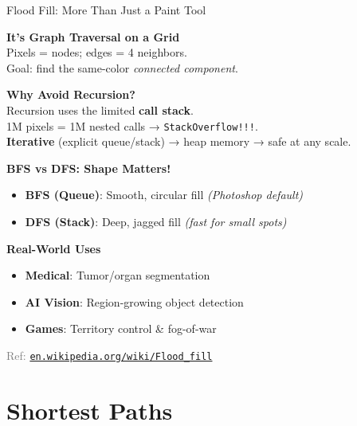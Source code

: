 \documentclass{beamer}
\begin{document}
\begin{frame}{Flood Fill: More Than Just a Paint Tool}
\footnotesize  %

\textcolor{new_turquoise}{\bf It's Graph Traversal on a Grid}\\
Pixels = nodes; edges = 4 neighbors.\\
Goal: find the same-color \textit{connected component}.

\vspace{0.2cm}
\textcolor{new_turquoise}{\bf Why Avoid Recursion?}\\
Recursion uses the limited \textbf{call stack}.\\
1M pixels = 1M nested calls →  \texttt{StackOverflow!!!}.\\
\textbf{Iterative} (explicit queue/stack) → heap memory → safe at any scale.

\vspace{0.2cm}
\textcolor{new_turquoise}{\bf BFS vs DFS: Shape Matters!}
\begin{itemize}
    \item \textbf{BFS (Queue)}: Smooth, circular fill \textit{(Photoshop default)}
    \item \textbf{DFS (Stack)}: Deep, jagged fill \textit{(fast for small spots)}
\end{itemize}

\vspace{0.2cm}
\textcolor{new_turquoise}{\bf Real-World Uses}
\begin{itemize}
    \item \textbf{Medical}: Tumor/organ segmentation
    \item \textbf{AI Vision}: Region-growing object detection
    \item \textbf{Games}: Territory control \& fog-of-war
\end{itemize}

\vspace{0.2cm}
{\footnotesize \textcolor{gray}{Ref:} \href{https://en.wikipedia.org/wiki/Flood_fill}{\texttt{en.wikipedia.org/wiki/Flood\_fill}}}
\end{frame}



\section{Shortest Paths}
\end{document}
